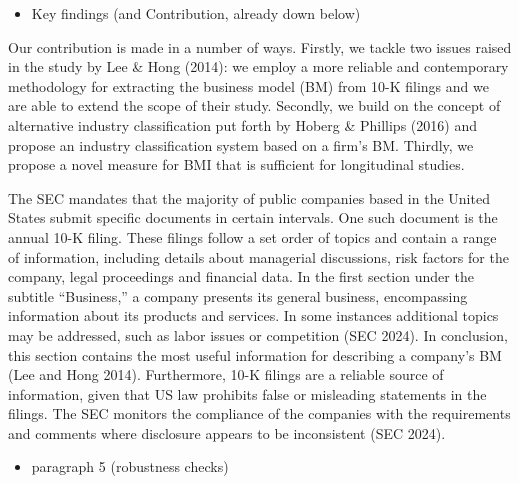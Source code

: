 \documentclass[
]{article}
\providecommand{\tightlist}{%
  \setlength{\itemsep}{0pt}\setlength{\parskip}{0pt}}\usepackage{longtable,booktabs,array}
\begin{document}
\begin{itemize}
\tightlist
\item
  Key findings (and Contribution, already down below)
\end{itemize}

Our contribution is made in a number of ways. Firstly, we tackle two
issues raised in the study by Lee \& Hong (2014): we employ a more
reliable and contemporary methodology for extracting the business model
(BM) from 10-K filings and we are able to extend the scope of their
study. Secondly, we build on the concept of alternative industry
classification put forth by Hoberg \& Phillips (2016) and propose an
industry classification system based on a firm's BM. Thirdly, we propose
a novel measure for BMI that is sufficient for longitudinal studies.

The SEC mandates that the majority of public companies based in the
United States submit specific documents in certain intervals. One such
document is the annual 10-K filing. These filings follow a set order of
topics and contain a range of information, including details about
managerial discussions, risk factors for the company, legal proceedings
and financial data. In the first section under the subtitle
``Business,'' a company presents its general business, encompassing
information about its products and services. In some instances
additional topics may be addressed, such as labor issues or competition
(SEC 2024). In conclusion, this section contains the most useful
information for describing a company's BM (Lee and Hong 2014).
Furthermore, 10-K filings are a reliable source of information, given
that US law prohibits false or misleading statements in the filings. The
SEC monitors the compliance of the companies with the requirements and
comments where disclosure appears to be inconsistent (SEC 2024).

\begin{itemize}
\tightlist
\item
  paragraph 5 (robustness checks)
\end{itemize}
\end{document}

